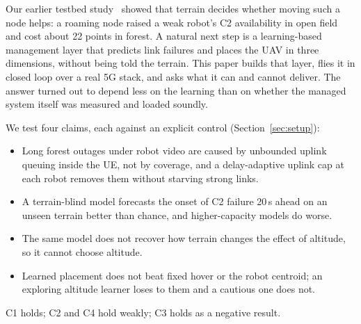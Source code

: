 Our earlier testbed study~\cite{makhubela2026satnac} showed that terrain
decides whether moving such a node helps: a roaming node raised a weak robot's
C2 availability in open field and cost about 22 points in forest. A natural next
step is a learning-based management layer that predicts link failures and
places the UAV in three dimensions, without being told the terrain. This paper
builds that layer, flies it in closed loop over a real 5G stack, and asks what
it can and cannot deliver. The answer turned out to depend less on the learning
than on whether the managed system itself was measured and loaded soundly.

We test four claims, each against an explicit control (Section~\ref{sec:setup}):
\begin{itemize}
\item[\textbf{C1}] Long forest outages under robot video are caused by
unbounded uplink queuing inside the UE, not by coverage, and a delay-adaptive
uplink cap at each robot removes them without starving strong links.
\item[\textbf{C2}] A terrain-blind model forecasts the onset of C2 failure
20\,s ahead on an unseen terrain better than chance, and higher-capacity models
do worse.
\item[\textbf{C3}] The same model does not recover how terrain changes the
effect of altitude, so it cannot choose altitude.
\item[\textbf{C4}] Learned placement does not beat fixed hover or the robot
centroid; an exploring altitude learner loses to them and a cautious one does
not.
\end{itemize}
C1 holds; C2 and C4 hold weakly; C3 holds as a negative result.

